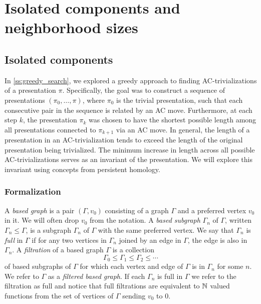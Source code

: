 
\section{Isolated components and neighborhood sizes}\label{sec:isolated}

\subsection{Isolated components}

In \autoref{ss:greedy_search}, we explored a greedy approach to finding AC-trivializations of a presentation \(\pi\).
Specifically, the goal was to construct a sequence of presentations \((\pi_0, \dots, \pi)\), where \(\pi_0\) is the trivial presentation, such that each consecutive pair in the sequence is related by an AC move.
Furthermore, at each step \(k\), the presentation \(\pi_k\) was chosen to have the shortest possible length among all presentations connected to \(\pi_{k+1}\) via an AC move.
In general, the length of a presentation in an AC-trivialization tends to exceed the length of the original presentation being trivialized.
The minimum increase in length across all possible AC-trivializations serves as an invariant of the presentation.
We will explore this invariant using concepts from persistent homology.

\subsubsection{Formalization}

A \textit{based graph} is a pair $(\Gamma, v_0)$ consisting of a graph $\Gamma$ and a preferred vertex $v_0$ in it.
We will often drop $v_0$ from the notation.
A \textit{based subgraph} $\Gamma_n$ of $\Gamma$, written $\Gamma_n \leq \Gamma$, is a subgraph $\Gamma_n$ of $\Gamma$ with the same preferred vertex.
We say that $\Gamma_n$ is \textit{full} in $\Gamma$ if for any two vertices in $\Gamma_n$ joined by an edge in $\Gamma$, the edge is also in $\Gamma_n$.
A \textit{filtration} of a based graph $\Gamma$ is a collection
\[
\Gamma_0 \leq \Gamma_1 \leq \Gamma_2 \leq \dotsb
\]
of based subgraphs of $\Gamma$ for which each vertex and edge of $\Gamma$ is in $\Gamma_n$ for some $n$.
We refer to $\Gamma$ as a \textit{filtered based graph}.
If each $\Gamma_n$ is full in $\Gamma$ we refer to the filtration as full and notice that full filtrations are equivalent to $\mathbb{N}$ valued functions from the set of vertices of $\Gamma$ sending $v_0$ to $0$.

